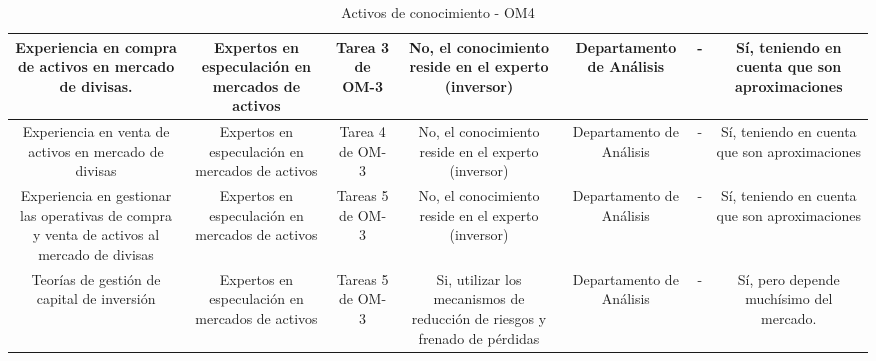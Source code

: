 \begin{table}[H]
{\begin{tabular}{|c|c|c|c|c|c|c|}
      \hline
      \multicolumn{1}{|p{6.0cm}|}{\centering Experiencia en compra de activos en mercado de divisas.} & \multicolumn{1}{|p{6.0cm}|}{\centering Expertos en especulación en mercados de activos} & \multicolumn{1}{|p{6.0cm}|}{\centering Tarea 3 de OM-3} & \multicolumn{1}{|p{6.0cm}|}{\centering No, el conocimiento reside en el experto (inversor)} &  Departamento de Análisis  & - & \multicolumn{1}{|p{6.0cm}|}{\centering Sí, teniendo en cuenta que son aproximaciones} \\
      \hline
      \multicolumn{1}{|p{6.0cm}|}{\centering Experiencia en venta de activos en mercado de divisas} & \multicolumn{1}{|p{6.0cm}|}{\centering Expertos en especulación en mercados de activos} & \multicolumn{1}{|p{6.0cm}|}{\centering Tarea 4 de OM-3} & \multicolumn{1}{|p{6.0cm}|}{\centering No, el conocimiento reside en el experto (inversor)} &  Departamento de Análisis  & - & \multicolumn{1}{|p{6.0cm}|}{\centering Sí, teniendo en cuenta que son aproximaciones} \\
      \hline
      \multicolumn{1}{|p{6.0cm}|}{\centering Experiencia en gestionar las operativas de compra y venta de activos al mercado de divisas} & \multicolumn{1}{|p{6.0cm}|}{\centering Expertos en especulación en mercados de activos} & \multicolumn{1}{|p{6.0cm}|}{\centering Tareas 5 de OM-3} & \multicolumn{1}{|p{6.0cm}|}{\centering No, el conocimiento reside en el experto (inversor)} &  Departamento de Análisis  & - & \multicolumn{1}{|p{6.0cm}|}{\centering Sí, teniendo en cuenta que son aproximaciones} \\
      \hline
      \multicolumn{1}{|p{6.0cm}|}{\centering Teorías de gestión de capital de inversión} & \multicolumn{1}{|p{6.0cm}|}{\centering Expertos en especulación en mercados de activos} & \multicolumn{1}{|p{6.0cm}|}{\centering Tareas 5 de OM-3} & \multicolumn{1}{|p{6.0cm}|}{\centering Si, utilizar los mecanismos de reducción de riesgos y frenado de pérdidas} &  Departamento de Análisis  & - & \multicolumn{1}{|p{6.0cm}|}{\centering Sí, pero depende muchísimo del mercado.} \\
      \hline
    \end{tabular}
  }
	\caption{\label{tab:OM4}Activos de conocimiento - OM4}
\end{table}

\clearpage